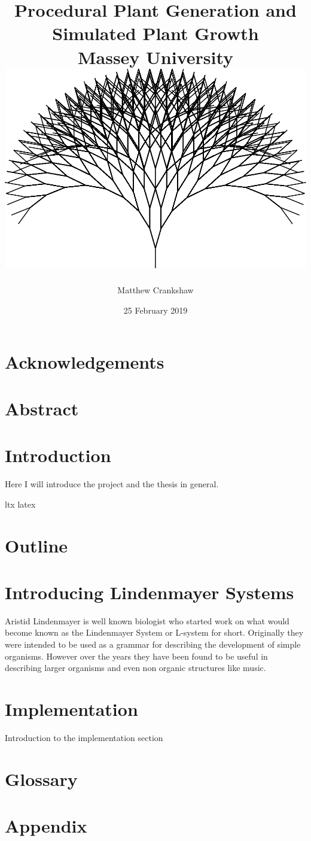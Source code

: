 \documentclass[11pt]{report}
\title{
{ Procedural Plant Generation and Simulated Plant Growth }\\
{\large Massey University}
\\
\vspace{2cm}
{\includegraphics[scale=0.35]{titlepage.png}}
\vspace{2cm}
}
\author{Matthew Crankshaw}
\date{25 February 2019}
\begin{document}
\maketitle

\chapter*{Acknowledgements}

\chapter*{Abstract}

\tableofcontents
\listoffigures


\chapter{Introduction}

Here I will introduce the project and the thesis in general.

\Gls{ltx}
\gls{latex}



\chapter{Outline}



\chapter{Introducing Lindenmayer Systems}

Aristid Lindenmayer is well known biologist who started work on what would become known as the Lindenmayer System or L-system for short. Originally they were intended to be used as a grammar for describing the development of simple organisms. However over the years they have been found to be useful in describing larger organisms and even non organic structures like music. \cite{worth2005growing} 



\chapter{Implementation}

Introduction to the implementation section



\chapter{Glossary}
\clearpage
\printglossaries

\appendix
\chapter{Appendix}

\end{document}
